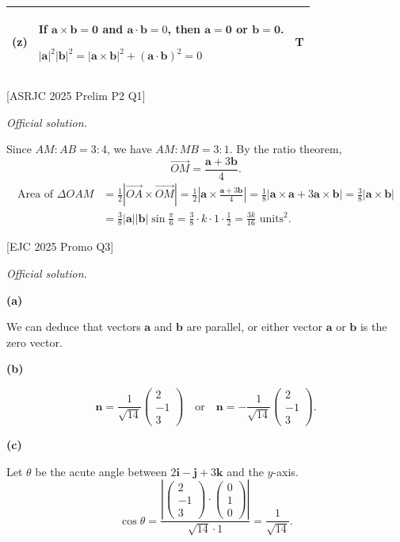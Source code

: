 \documentclass[a4paper,11pt,oneside]{book}
\providecommand{\vv}[1]{\overrightarrow{#1}}\providecommand{\cvv}[3]{\begin{pmatrix}#1\\#2\\#3\end{pmatrix}}
\newcounter{wq}
\newcommand{\Q}[1]{\par\needspace{5\baselineskip}\medskip\stepcounter{wq}\noindent\textbf{\thewq}\quad #1\par}
\begin{document}
{\begin{longtable}{|>{\centering\arraybackslash}p{0.9cm}|p{\dimexpr\linewidth-0.9cm-1.6cm-6\tabcolsep-4\arrayrulewidth\relax}|>{\centering\arraybackslash}p{1.6cm}|}
(z)&If $\mathbf a\times\mathbf b=\mathbf 0$ and $\mathbf a\cdot\mathbf b=0$, then $\mathbf a=\mathbf 0$ or $\mathbf b=\mathbf 0$.\par\smallskip $\displaystyle |\mathbf a|^2|\mathbf b|^2=|\mathbf a\times\mathbf b|^2+(\mathbf a\cdot\mathbf b)^2=0$\rule[-6pt]{0pt}{6pt}&\textbf{T}\\\hline\end{longtable}}
\Q{\textcolor{black!60}{\small[ASRJC 2025 Prelim P2 Q1]}\par\smallskip\textit{Official solution.}}
Since $AM:AB=3:4$, we have $AM:MB=3:1$. By the ratio theorem,
\[\vv{OM}=\frac{\mathbf a+3\mathbf b}{4}.\]
\begin{align*}
\text{Area of }\Delta OAM
&=\frac12\left|\vv{OA}\times\vv{OM}\right|
=\frac12\left|\mathbf a\times\frac{\mathbf a+3\mathbf b}{4}\right|
=\frac18\left|\mathbf a\times\mathbf a+3\mathbf a\times\mathbf b\right|
=\frac38|\mathbf a\times\mathbf b|\\
&=\frac38|\mathbf a||\mathbf b|\sin\frac{\pi}{6}
=\frac38\cdot k\cdot 1\cdot\frac12
=\frac{3k}{16}\text{ units}^2.
\end{align*}

\Q{\textcolor{black!60}{\small[EJC 2025 Promo Q3]}\par\smallskip\textit{Official solution.}}
\par\smallskip\noindent\textbf{(a)}\par
We can deduce that vectors $\mathbf a$ and $\mathbf b$ are parallel, or either vector $\mathbf a$ or $\mathbf b$ is the zero vector.
\par\smallskip\noindent\textbf{(b)}\par
\[\mathbf n=\frac{1}{\sqrt{14}}\cvv{2}{-1}{3}\quad\text{or}\quad\mathbf n=-\frac{1}{\sqrt{14}}\cvv{2}{-1}{3}.\]
\par\smallskip\noindent\textbf{(c)}\par
Let $\theta$ be the acute angle between $2\mathbf i-\mathbf j+3\mathbf k$ and the $y$-axis.
\[\cos\theta=\frac{\left|\cvv{2}{-1}{3}\cdot\cvv{0}{1}{0}\right|}{\sqrt{14}\cdot 1}=\frac{1}{\sqrt{14}}.\]
\end{document}
